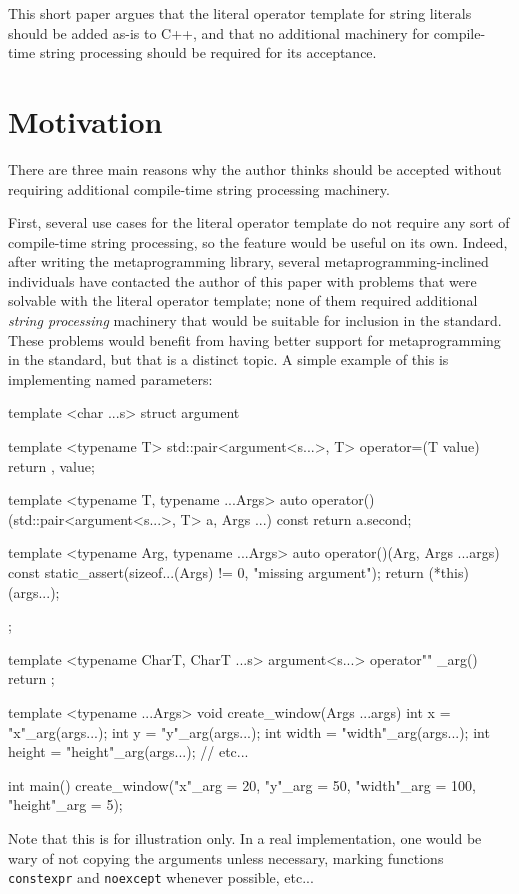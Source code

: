 \documentclass[11pt]{article}
\newcommand{\cc}[1]{\texttt{#1}}
\begin{document}
This short paper argues that the literal operator template for string
literals should be added as-is to C++, and that no additional machinery
for compile-time string processing should be required for its acceptance.


\section{Motivation}
There are three main reasons why the author thinks \cite{N3599} should be
accepted without requiring additional compile-time string processing machinery.

First, several use cases for the literal operator template do not require any
sort of compile-time string processing, so the feature would be useful on its
own. Indeed, after writing the \cite{Boost.Hana} metaprogramming library,
several metaprogramming-inclined individuals have contacted the author of this
paper with problems that were solvable with the literal operator template; none
of them required additional \textit{string processing} machinery that would be
suitable for inclusion in the standard. These problems would benefit from
having better support for metaprogramming in the standard, but that is a
distinct topic. A simple example of this is implementing named parameters:

\begin{cpp}
template <char ...s>
struct argument {
  template <typename T>
  std::pair<argument<s...>, T> operator=(T value) {
    return {{}, value};
  }

  template <typename T, typename ...Args>
  auto operator()(std::pair<argument<s...>, T> a, Args ...) const {
    return a.second;
  }

  template <typename Arg, typename ...Args>
  auto operator()(Arg, Args ...args) const {
    static_assert(sizeof...(Args) != 0, "missing argument");
    return (*this)(args...);
  }
};

template <typename CharT, CharT ...s>
argument<s...> operator"" _arg() { return {}; }

template <typename ...Args>
void create_window(Args ...args) {
  int x = "x"_arg(args...);
  int y = "y"_arg(args...);
  int width = "width"_arg(args...);
  int height = "height"_arg(args...);
  // etc...
}

int main() {
  create_window("x"_arg = 20, "y"_arg = 50, "width"_arg = 100, "height"_arg = 5);
}
\end{cpp}

Note that this is for illustration only. In a real implementation, one would
be wary of not copying the arguments unless necessary, marking functions
\cc{constexpr} and \cc{noexcept} whenever possible, etc...
\end{document}
